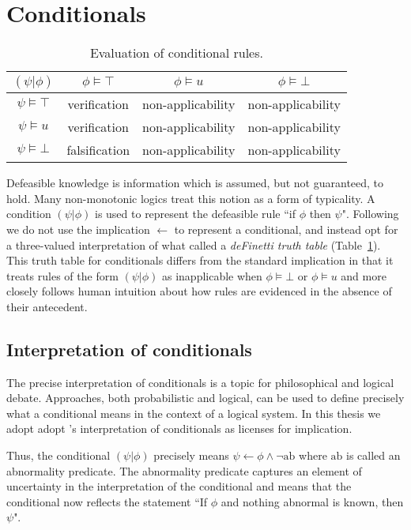 \section{Conditionals} \label{ssec:condi}
\begin{table}
\begin{center}
\begin{tabular}{ c | c c c }
  $(\psi|\phi)$& $\phi\models \top$ & $\phi \models u$ & $\phi \models \bot$ \\ \hline
 $\psi\models \top$ & verification &  non-applicability & non-applicability \\  
  $\psi\models u$ & verification &  non-applicability & non-applicability \\ 
 $\psi \models \bot$ & falsification &  non-applicability & non-applicability
\end{tabular}
\caption{Evaluation of conditional rules.}
\label{tbl:cond}
\end{center}
\end{table}

Defeasible knowledge is information which is assumed, but not guaranteed, to hold. Many non-monotonic logics treat this notion as a form of typicality. A condition $(\psi|\phi)$ is used to represent the defeasible rule ``if $\phi$ then $\psi$". Following \cite{wason1968reasoning} we do not use the implication $\leftarrow$ to represent a conditional, and instead opt for a three-valued interpretation of what \cite{baratgin2014new} called a \textit{deFinetti truth table} (Table~\ref{tbl:cond}). This truth table for conditionals differs from the standard implication in that it treats rules of the form $(\psi|\phi)$ as inapplicable when $\phi \models \bot$ or $\phi \models u$ and more closely follows human intuition about how rules are evidenced in the absence of their antecedent.

\subsection{Interpretation of conditionals} \label{ssec:condInterpretation}
The precise interpretation of conditionals is a topic for philosophical and logical debate. Approaches, both probabilistic and logical, can be used to define precisely what a conditional means in the context of a logical system. In this thesis we adopt adopt \cite{stenning2008interpretation}'s interpretation of conditionals as licenses for implication. 

Thus, the conditional $(\psi|\phi)$ precisely means $\psi \leftarrow \phi \land \lnot \text{ab}$ where $\text{ab}$ is called an abnormality predicate. The abnormality predicate captures an element of uncertainty in the interpretation of the conditional and means that the conditional now reflects the statement ``If $\phi$ and nothing abnormal is known, then $\psi$".

